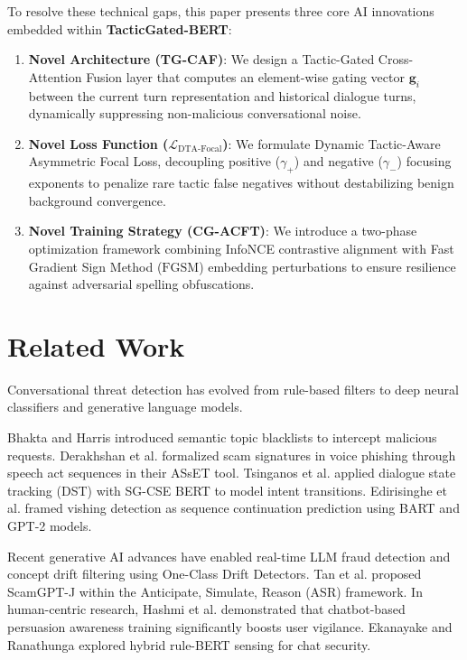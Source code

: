 \documentclass[10pt,conference]{IEEEtran}
\begin{document}
To resolve these technical gaps, this paper presents three core AI innovations embedded within \textbf{TacticGated-BERT}:
\begin{enumerate}
    \item \textbf{Novel Architecture (TG-CAF)}: We design a Tactic-Gated Cross-Attention Fusion layer that computes an element-wise gating vector $\mathbf{g}_i$ between the current turn representation and historical dialogue turns, dynamically suppressing non-malicious conversational noise.
    \item \textbf{Novel Loss Function ($\mathcal{L}_{\text{DTA-Focal}}$)}: We formulate Dynamic Tactic-Aware Asymmetric Focal Loss, decoupling positive ($\gamma_+$) and negative ($\gamma_-$) focusing exponents to penalize rare tactic false negatives without destabilizing benign background convergence.
    \item \textbf{Novel Training Strategy (CG-ACFT)}: We introduce a two-phase optimization framework combining InfoNCE contrastive alignment with Fast Gradient Sign Method ($\text{FGSM}$) embedding perturbations to ensure resilience against adversarial spelling obfuscations.
\end{enumerate}

\section{Related Work}
Conversational threat detection has evolved from rule-based filters to deep neural classifiers and generative language models.

Bhakta and Harris \cite{bhakta2015semantic} introduced semantic topic blacklists to intercept malicious requests. Derakhshan et al. \cite{derakhshan2021detecting} formalized scam signatures in voice phishing through speech act sequences in their ASsET tool. Tsinganos et al. \cite{tsinganos2023leveraging} applied dialogue state tracking (DST) with SG-CSE BERT to model intent transitions. Edirisinghe et al. \cite{edirisinghe2025conversation} framed vishing detection as sequence continuation prediction using BART and GPT-2 models.

Recent generative AI advances have enabled real-time LLM fraud detection \cite{otuburun2025realtime} and concept drift filtering \cite{senol2025joint} using One-Class Drift Detectors. Tan et al. \cite{tan2025anticipate} proposed ScamGPT-J within the Anticipate, Simulate, Reason (ASR) framework. In human-centric research, Hashmi et al. \cite{hashmi2023training} demonstrated that chatbot-based persuasion awareness training significantly boosts user vigilance. Ekanayake and Ranathunga \cite{ekanayake2026hybrid} explored hybrid rule-BERT sensing for chat security.
\end{document}
